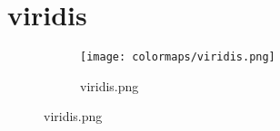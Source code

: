 \documentclass{article}%
\begin{document}
%
\newpage%
\section{viridis}%
\label{sec:viridis}%
\hspace{1cm}\hfill%


\begin{figure}[h!]%
\begin{subfigure}[b]{0.3\linewidth}%
\texttt{[image: colormaps/viridis.png]}%
\caption{viridis.png}%
\end{subfigure}%
\end{figure}

%
\newpage%
\restoregeometry%
\end{document}
